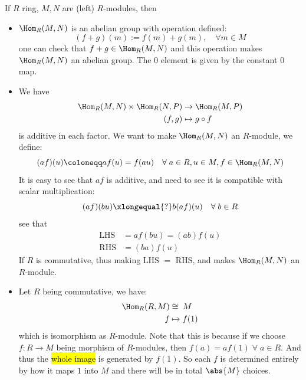 \begin{remark}
	If \( R \) ring, \( M,N \) are (left) \( R \)-modules, then
	\begin{itemize}
		\item \( \Hom_R (M,N) \) is an abelian group with operation defined:
		      \[
			      (f+g)(m) := f(m) + g(m), \quad \forall m \in M
		      \]
		      one can check that \( f + g \in \Hom_R (M,N) \) and this operation makes \( \Hom_R (M,N) \)
		      an abelian group. The \( 0 \) element is given by the constant \( 0 \) map.
		\item We have
		      \[
			      \begin{aligned}
				      \Hom_R (M,N) \times \Hom_R(N,P) & \to \Hom_R (M,P) \\
				      (f,g)                           & \mapsto g\circ f
			      \end{aligned}
		      \]
		      is additive in each factor. We want to make \( \Hom_R (M,N) \) an \( R \)-module, we
		      define:
		      \[
			      (af)(u) \coloneqq  af(u) = f(au) \quad \forall \; a\in R, u\in M, f \in \Hom_R (M,N)
		      \]
		      It is easy to see that \( af \) is additive, and need to see it is compatible with scalar
		      multiplication:
		      \[
			      (af)(bu) \xlongequal{?} b(af)(u) \quad \forall \; b \in R
		      \]
		      see that
		      \[
			      \begin{aligned}
				      \text{LHS} & = af(bu) = (ab)f(u) \\
				      \text{RHS} & = (ba) f(u)
			      \end{aligned}
		      \]
		      If \( R \) is commutative, thus making LHS \( = \) RHS, and makes \( \Hom_R (M,N) \) an \(
		      R\)-module.
		\item Let \( R \) being commutative, we have:
		      \[
			      \begin{aligned}
				      \Hom_R (R,M) & \cong \; M   \\
				      f            & \mapsto f(1)
			      \end{aligned}
		      \]
		      which is isomorphism as \( R \)-module. Note that this is because if we choose \( f: R \to
		      M\) being morphism of \( R \)-modules, then \( f(a) = af(1) \; \forall \; a\in R \). And
		      thus the \hl{whole image} is generated by \( f(1) \). So each \( f \) is determined entirely by
		      how it maps \( 1 \) into \( M \) and there will be in total \( \abs{M} \) choices.
	\end{itemize}
\end{remark}

